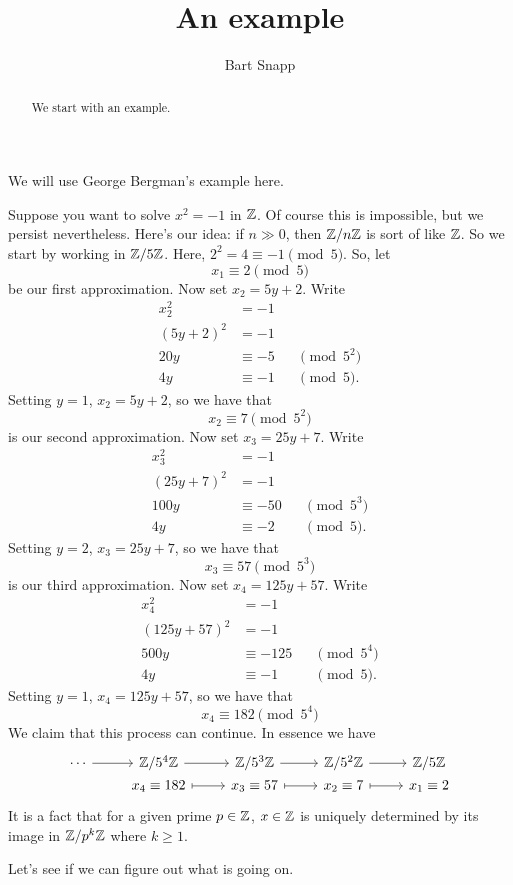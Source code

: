 \documentclass{ximera}
\author{Bart Snapp}
\title{An example}
\begin{document}
\begin{abstract}
  We start with an example. 
\end{abstract}
\maketitle

We will use George Bergman's example here.

Suppose you want to solve $x^2 =-1$ in $\mathbb Z$. Of course this is
impossible, but we persist nevertheless. Here's our idea: if $n\gg 0$,
then $\mathbb Z/n \mathbb Z$ is sort of like $\mathbb Z$. So we start by working in
$\mathbb Z/5\mathbb Z$. Here, $2^2 = 4 \equiv -1\pmod{5}$. So, let
\[
x_1\equiv 2\pmod{5}
\]
be our first approximation.  Now set $x_2 = 5 y +2$. Write
\begin{align*}
  x_2^2 &= -1 \\
  (5 y +2)^2 &= -1\\
  20y &\equiv -5 && \pmod{5^2}\\
  4y &\equiv -1 &&\pmod{5}.
\end{align*}
Setting $y = 1$, $x_2 = 5y+2$, so we have that
\[
x_2 \equiv 7 \pmod{5^2}
\]
is our second approximation. Now set $x_3 = 25 y + 7$. Write
\begin{align*}
  x_3^2 &= -1\\
  (25 y + 7)^2 &= -1\\
  100y &\equiv -50 && \pmod{5^3}\\
  4y &\equiv -2 &&\pmod{5}.
\end{align*}
Setting $y = 2$, $x_3= 25 y + 7$, so we have that
\[
x_3 \equiv 57 \pmod{5^3}
\]
is our third approximation. Now set $x_4 = 125 y + 57$. Write
\begin{align*}
x_4^2 &= -1\\
(125y + 57)^2 &=-1\\
500y &\equiv -125 && \pmod{5^4}\\
4y &\equiv -1 && \pmod{5}.
\end{align*}
Setting $y = 1$, $x_4 = 125y + 57$, so we have that
\[
x_4 \equiv 182 \pmod{5^4}
\]
We claim that this process can continue. In essence we have
\[
\begin{tikzcd}[row sep=0em,]
  \cdots \ar[r] & \Z/5^4\Z \ar[r] & \Z/5^3\Z \ar[r] & \Z/5^2\Z \ar[r] & \Z/5\Z \\
  & x_4\equiv 182 \ar[r,mapsto] & x_3\equiv 57 \ar[r,mapsto] & x_2\equiv 7 \ar[r,mapsto] &  x_1\equiv 2
\end{tikzcd}
\]
It is a fact that for a given prime $p\in \mathbb Z$, $x\in\mathbb Z$ is uniquely
determined by its image in $\mathbb Z/p^k\mathbb Z$ where $k\ge 1$.

Let's see if we can figure out what is going on.
\end{document}
